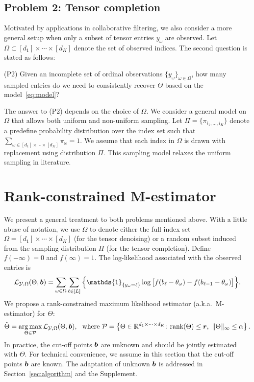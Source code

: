 \documentclass{article}
\theoremstyle{plain}
\theoremstyle{definition}
\begin{document}
\subsection{Problem 2: Tensor completion}
\vspace{-.2cm}
Motivated by applications in collaborative filtering, we also consider a more general setup when only a subset of tensor entries $y_\omega$ are observed. Let $\Omega\subset[d_1]\times \cdots\times[d_K]$ denote the set of observed indices. The second question is stated as follows:

(P2) Given an incomplete set of ordinal observations $\{y_{\omega}\}_{\omega\in\Omega}$, how many sampled entries do we need to consistently recover $\Theta$ based on the model~\eqref{eq:model}?

The answer to (P2) depends on the choice of $\Omega$. We consider a general model on $\Omega$ that allows both uniform and non-uniform sampling. Let $\Pi=\{\pi_{i_1,\ldots,i_K}\}$ denote a predefine probability distribution over the index set such that $\sum_{\omega\in[d_1]\times \cdots \times [d_K]} \pi_\omega =1$. We assume that each index in $\Omega$ is drawn with replacement using distribution $\Pi$. This sampling model relaxes the uniform sampling in literature.

\vspace{-.3cm}
\section{Rank-constrained M-estimator}\label{sec:theory}
\vspace{-.2cm}
We present a general treatment to both problems mentioned above. With a little abuse of notation, we use $\Omega$ to denote either the full index set $\Omega=[d_1]\times \cdots \times [d_K]$ (for the tensor denoising) or a random subset induced from the sampling distribution $\Pi$ (for the tensor completion). Define $f(-\infty)=0$ and $f(\infty)=1$. The log-likelihood associated with the observed entries is
\begin{align}\label{eq:objective}
\logl(\Theta, \mb)=\sum_{\omega\in\Omega}\sum_{\ell\in[L]} \Big\{\mathds{1}_{\{y_\omega=\ell\}} \log \big[f(b_\ell-\theta_\omega)-  f(b_{\ell-1}-\theta_\omega)\big]\Big\}.
\end{align}
We propose a rank-constrained maximum likelihood estimator (a.k.a.\ M-estimator) for $\Theta$:
\begin{align}\label{eq:estimator}
\hat \Theta=\operatorname*{arg\,max}_{\Theta\in \mathcal{P}}\mathcal{L}_{\mathcal{Y},\Omega}(\Theta, \bm{b}),\ \text{ where } 
\mathcal{P}=\left\{\Theta\in\mathbb{R}^{d_1\times \cdots \times d_K} \colon \text{rank}(\Theta)\leq \bm{r},\ \lVert\Theta\rVert_\infty\leq \alpha\right\}.
 \end{align}
In practice, the cut-off points $\bm{b}$ are unknown and should be jointly estimated with $\Theta$. For technical convenience, we assume in this section that the cut-off points $\bm{b}$ are known. The adaptation of unknown $\bm{b}$ is addressed in Section~\ref{sec:algorithm} and the Supplement.
\end{document}
